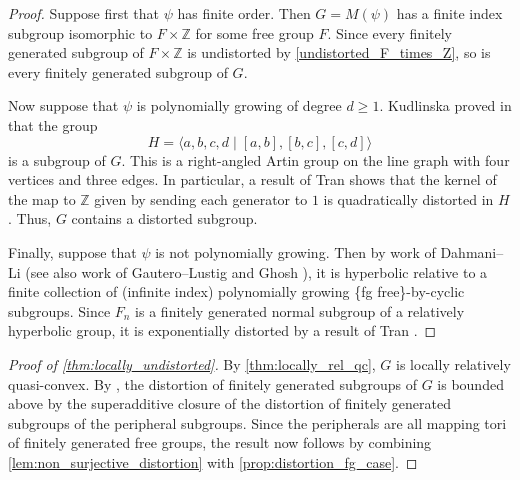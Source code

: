 \documentclass[11pt, a4paper]{amsart}
\theoremstyle{definition}
\newcommand{\Z}{\mathbb{Z}}
\begin{document}
\begin{proof}
Suppose first that $\psi$ has finite order. Then $G = M(\psi)$ has a finite index subgroup isomorphic to $F\times\Z$ for some free group $F$. Since every finitely generated subgroup of $F\times\Z$ is undistorted by \cref{undistorted_F_times_Z}, so is every finitely generated subgroup of $G$.

Now suppose that $\psi$ is polynomially growing of degree $d\geqslant 1$. Kudlinska proved in \cite[Theorem 3.4]{Ku24} that the group 
\[
H = \langle a, b, c, d \mid [a, b], [b, c], [c, d]\rangle
\]
is a subgroup of $G$. This is a right-angled Artin group on the line graph with four vertices and three edges. In particular, a result of Tran \cite[Theorem 1.1]{Tr17} shows that the kernel of the map to $\Z$ given by sending each generator to $1$ is quadratically distorted in $H$. Thus, $G$ contains a distorted subgroup.

Finally, suppose that $\psi$ is not polynomially growing. Then by work of Dahmani--Li \cite[Theorem 4]{DL22} (see also work of Gautero--Lustig \cite{GL08} and Ghosh \cite{Gh23}), it is hyperbolic relative to a finite collection of (infinite index) polynomially growing \{fg free\}-by-cyclic subgroups. Since $F_n$ is a finitely generated normal subgroup of a relatively hyperbolic group, it is exponentially distorted by a result of Tran \cite[Corollary 1.2]{Tr21}.
\end{proof}

\begin{proof}[Proof of \cref{thm:locally_undistorted}]
By \cref{thm:locally_rel_qc}, $G$ is locally relatively quasi-convex. By \cite[Theorem 1.4]{Hr10}, the distortion of finitely generated subgroups of $G$ is bounded above by the superadditive closure of the distortion of finitely generated subgroups of the peripheral subgroups. Since the peripherals are all mapping tori of finitely generated free groups, the result now follows by combining \cref{lem:non_surjective_distortion} with \cref{prop:distortion_fg_case}.
\end{proof}










\end{document}
